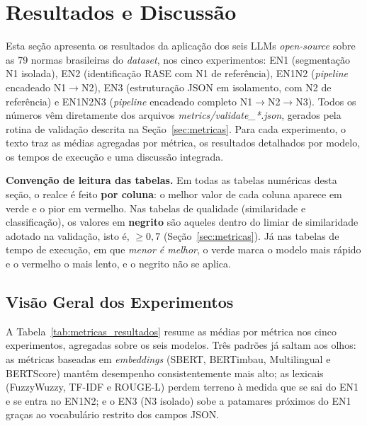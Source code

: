 \documentclass[a4paper,fleqn]{cas-sc}
\newcommand{\melhor}[1]{\textcolor{green!55!black}{#1}}
\newcommand{\pior}[1]{\textcolor{red!80!black}{#1}}
\begin{document}
\section{Resultados e Discussão}\label{sec:resultados}

Esta seção apresenta os resultados da aplicação dos seis LLMs \textit{open-source} sobre as 79 normas brasileiras do \textit{dataset}, nos cinco experimentos: EN1 (segmentação N1 isolada), EN2 (identificação RASE com N1 de referência), EN1N2 (\textit{pipeline} encadeado N1$\rightarrow$N2), EN3 (estruturação JSON em isolamento, com N2 de referência) e EN1N2N3 (\textit{pipeline} encadeado completo N1$\rightarrow$N2$\rightarrow$N3). Todos os números vêm diretamente dos arquivos \textit{metrics/validate\_*.json}, gerados pela rotina de validação descrita na Seção~\ref{sec:metricas}. Para cada experimento, o texto traz as médias agregadas por métrica, os resultados detalhados por modelo, os tempos de execução e uma discussão integrada.

\textbf{Convenção de leitura das tabelas.} Em todas as tabelas numéricas desta seção, o realce é feito \textbf{por coluna}: o melhor valor de cada coluna aparece em \melhor{verde} e o pior em \pior{vermelho}. Nas tabelas de qualidade (similaridade e classificação), os valores em \textbf{negrito} são aqueles dentro do limiar de similaridade adotado na validação, isto é, \(\geq 0{,}7\) (Seção~\ref{sec:metricas}). Já nas tabelas de tempo de execução, em que \emph{menor é melhor}, o \melhor{verde} marca o modelo mais rápido e o \pior{vermelho} o mais lento, e o negrito não se aplica.

\subsection{Visão Geral dos Experimentos}

A Tabela~\ref{tab:metricas_resultados} resume as médias por métrica nos cinco experimentos, agregadas sobre os seis modelos. Três padrões já saltam aos olhos: as métricas baseadas em \textit{embeddings} (SBERT, BERTimbau, Multilingual e BERTScore) mantêm desempenho consistentemente mais alto; as lexicais (FuzzyWuzzy, TF-IDF e ROUGE-L) perdem terreno à medida que se sai do EN1 e se entra no EN1N2; e o EN3 (N3 isolado) sobe a patamares próximos do EN1 graças ao vocabulário restrito dos campos JSON.
\end{document}
